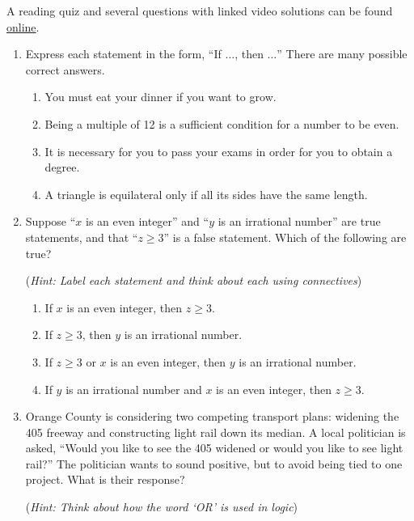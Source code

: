 \begin{exercises}{}{}
	A reading quiz and several questions with linked video solutions can be found \href{http://www.math.uci.edu/~ndonalds/math13/selftest/2-1-props.html}{online}.


	\begin{enumerate}
	  \item Express each statement in the form, ``If $\dots$, then $\dots$'' There are many possible correct answers.
			\begin{enumerate}
		  	\item You must eat your dinner if you want to grow.
		  	\item Being a multiple of 12 is a sufficient condition for a number to be even.
		  	\item It is necessary for you to pass your exams in order for you to obtain a degree. 
		  	\item A triangle is equilateral only if all its sides have the same length.
			\end{enumerate}
		
	
	  \item Suppose ``$x$ is an even integer'' and ``$y$ is an irrational number'' are true statements, and that ``$z\geq 3$'' is a false statement. Which of the following are true?\par
	  (\emph{Hint: Label each statement and think about each using connectives})
			\begin{enumerate}
		  	\item If $x$ is an even integer, then $z\geq 3$.
		  	\item If $z\geq 3$, then $y$ is an irrational number.
		  	\item If $z\geq 3$ or $x$ is an even integer, then $y$ is an irrational number.
		  	\item If $y$ is an irrational number and $x$ is an even integer, then $z\geq 3$.
			\end{enumerate}


	  \item Orange County is considering two competing transport plans: widening the 405 freeway and constructing light rail down its median. A local politician is asked, ``Would you like to see the 405 widened or would you like to see light rail?'' The politician wants to sound positive, but to avoid being tied to one project. What is their response?\par
	  (\emph{Hint: Think about how the word `OR' is used in logic})
  

\end{enumerate}
\end{exercises}
